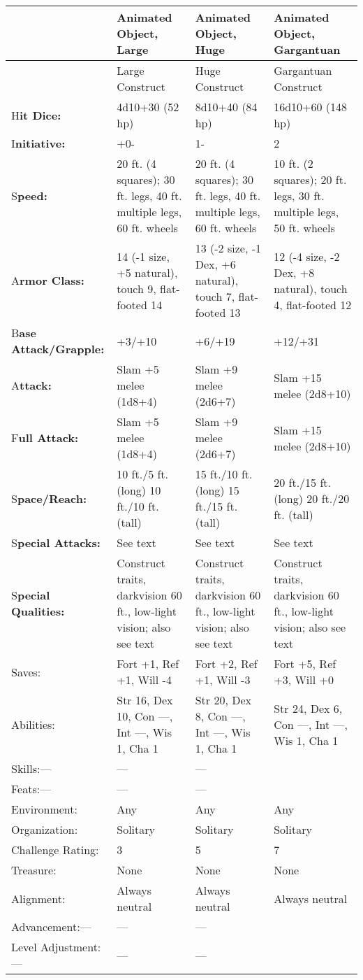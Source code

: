 \documentclass{article}
\begin{document}
\vspace{12pt}
\begin{tabular}{|>{\raggedright}p{52pt}|>{\raggedright}p{82pt}|>{\raggedright}p{82pt}|>{\raggedright}p{85pt}|}
\hline
  & A\textbf{nimated Object, Large} & A\textbf{nimated Object, Huge} & A\textbf{nimated 
Object, Gargantuan}\tabularnewline
\hline
  & Large Construct & Huge Construct & Gargantuan Construct\tabularnewline
\hline
H\textbf{it Dice:} & 4d10+30 (52 hp) & 8d10+40 (84 hp) & 16d10+60 (148 hp)\tabularnewline
\hline
I\textbf{nitiative:} & +0- & 1- & 2\tabularnewline
\hline
S\textbf{peed:} & 20 ft. (4 squares); 30 ft. legs, 40 ft. multiple legs, 60 ft. 
wheels & 20 ft. (4 squares); 30 ft. legs, 40 ft. multiple legs, 60 ft. wheels & 10 
ft. (2 squares); 20 ft. legs, 30 ft. multiple legs, 50 ft. wheels\tabularnewline
\hline
A\textbf{rmor Class:} & 14 (-1 size, +5 natural), touch 9, flat-footed 14 & 13 
(-2 size, -1 Dex, +6 natural), touch 7, flat-footed 13 & 12 (-4 size, -2 Dex, +8 
natural), touch 4, flat-footed 12\tabularnewline
\hline
B\textbf{ase Attack/Grapple:} & +3/+10 & +6/+19 & +12/+31\tabularnewline
\hline
A\textbf{ttack:} & Slam +5 melee (1d8+4) & Slam +9 melee (2d6+7) & Slam +15 melee 
(2d8+10)\tabularnewline
\hline
F\textbf{ull Attack:} & Slam +5 melee (1d8+4) & Slam +9 melee (2d6+7) & Slam +15 
melee (2d8+10)\tabularnewline
\hline
S\textbf{pace/Reach: } & 10 ft./5 ft. (long)\linebreak{}
10 ft./10 ft. (tall) & 15 ft./10 ft. (long)\linebreak{}
15 ft./15 ft. (tall) & 20 ft./15 ft. (long)\linebreak{}
20 ft./20 ft. (tall)\tabularnewline
\hline
S\textbf{pecial Attacks:} & See text & See text & See text\tabularnewline
\hline
S\textbf{pecial Qualities:} & Construct traits, darkvision 60 ft., low-light vision; 
also see text & Construct traits, darkvision 60 ft., low-light vision; also see 
text & Construct traits, darkvision 60 ft., low-light vision; also see text\tabularnewline
\hline
Saves: & Fort +1, Ref +1, Will -4 & Fort +2, Ref +1, Will -3 & Fort +5, Ref +3, 
Will +0\tabularnewline
\hline
Abilities:  & Str 16, Dex 10, Con ---, Int ---, Wis 1, Cha 1 & Str 20, Dex 8, Con 
---, Int ---, Wis 1, Cha 1 & Str 24, Dex 6, Con ---, Int ---, Wis 1, Cha 1\tabularnewline
\hline
Skills:--- & --- & --- & \tabularnewline
\hline
Feats:--- & --- & --- & \tabularnewline
\hline
Environment: & Any & Any & Any\tabularnewline
\hline
Organization: & Solitary & Solitary & Solitary\tabularnewline
\hline
Challenge Rating: & 3 & 5 & 7\tabularnewline
\hline
Treasure: & None & None & None\tabularnewline
\hline
Alignment: & Always neutral & Always neutral & Always neutral\tabularnewline
\hline
Advancement:--- & --- & --- & \tabularnewline
\hline
Level Adjustment:--- & --- & --- & \tabularnewline
\hline
\end{tabular}
\end{document}
